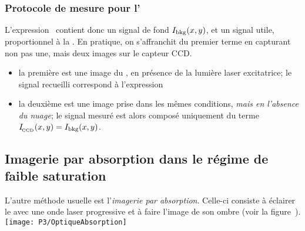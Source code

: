\subsubsection{Protocole de mesure pour l'\ipf}

L'expression~ contient donc un signal de fond ${{{I}_{\rm bkg}}(x,y)}$, et un signal utile, proportionnel à la \dcol. En pratique, on s'affranchit du premier terme en capturant non pas une, mais deux images sur le capteur CCD.
\begin{itemize}
	\item la première est une image du \nat, en présence de la lumière laser excitatrice; le signal recueilli correspond à l'expression~
	\item la deuxième est une image prise dans les mêmes conditions, \emph{mais en l'absence du nuage}; le signal mesuré est alors composé uniquement du terme ${{I_{_{\hspace{-1pt}{\rm CCD}}}}(x,y)} = {{{I}_{\rm bkg}}(x,y)}$.
\end{itemize}



\subsection{Imagerie par absorption dans le régime de faible saturation}\label{sec:ipafas}
L'autre méthode usuelle est l'\emph{imagerie par absorption}. Celle-ci consiste à éclairer le \nat avec une onde laser progressive et à faire l'image de son ombre (voir la figure~).
%
\bfighs
\texttt{[image: P3/OptiqueAbsorption]}
\label{fig:OptiqueAbsorption}
\efigh


